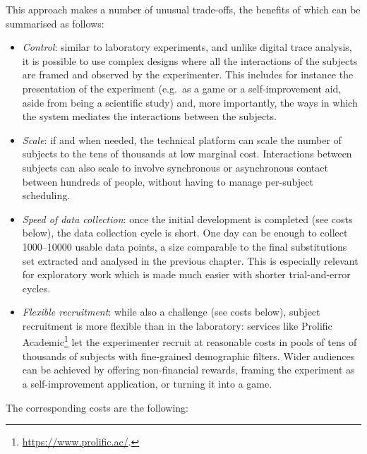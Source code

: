 This approach makes a number of unusual trade-offs, the benefits of
which can be summarised as follows:

\begin{itemize}
\item
  \emph{Control}: similar to laboratory experiments, and unlike digital
  trace analysis, it is possible to use complex designs where all the
  interactions of the subjects are framed and observed by the
  experimenter. This includes for instance the presentation of the
  experiment (e.g.~as a game or a self-improvement aid, aside from being
  a scientific study) and, more importantly, the ways in which the
  system mediates the interactions between the subjects.
\item
  \emph{Scale}: if and when needed, the technical platform can scale the
  number of subjects to the tens of thousands at low marginal cost.
  Interactions between subjects can also scale to involve synchronous or
  asynchronous contact between hundreds of people, without having to
  manage per-subject scheduling.
\item
  \emph{Speed of data collection}: once the initial development is
  completed (see costs below), the data collection cycle is short. One
  day can be enough to collect \num{1000}--\num{10000} usable data
  points, a size comparable to the final substitutions set extracted and
  analysed in the previous chapter. This is especially relevant for
  exploratory work which is made much easier with shorter
  trial-and-error cycles.
\item
  \emph{Flexible recruitment}: while also a challenge (see costs below),
  subject recruitment is more flexible than in the laboratory: services
  like Prolific Academic\footnote{\url{https://www.prolific.ac/}.} let
  the experimenter recruit at reasonable costs in pools of tens of
  thousands of subjects with fine-grained demographic filters. Wider
  audiences can be achieved by offering non-financial rewards, framing
  the experiment as a self-improvement application, or turning it into a
  game.
\end{itemize}

The corresponding costs are the following:

